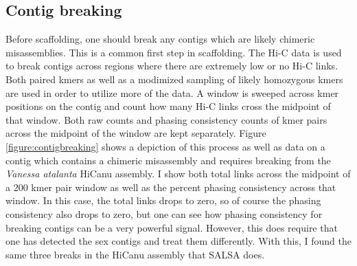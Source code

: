 {\subsection{Contig breaking}

\par{
Before scaffolding, one should break any contigs which are likely chimeric misassemblies. This is a common first step in scaffolding\cite{SALSA}\cite{scaffoldingreview}. The Hi-C data is used to break contigs across regions where there are extremely low or no Hi-C links. Both paired kmers as well as a modimized sampling of likely homozygous kmers are used in order to utilize more of the data. A window is sweeped across kmer positions on the contig and count how many Hi-C links cross the midpoint of that window. Both raw counts and phasing consistency counts of kmer pairs across the midpoint of the window are kept separately. Figure \ref{figure:contigbreaking} shows a depiction of this process as well as data on a contig which contains a chimeric misassembly and requires breaking from the \textit{Vanessa atalanta} HiCanu assembly. I show both total links across the midpoint of a 200 kmer pair window as well as the percent phasing consistency across that window. In this case, the total links drops to zero, so of course the phasing consistency also drops to zero, but one can see how phasing consistency for breaking contigs can be a very powerful signal. However, this does require that one has detected the sex contigs and treat them differently. With this, I found the same three breaks in the HiCanu assembly that SALSA does.
}

}
